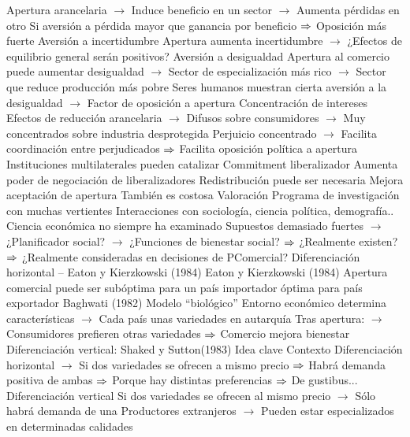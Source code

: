 \documentclass{nuevotema}
\begin{document}
\begin{esquemal}
				\4 Apertura arancelaria
				\4[] $\to$ Induce beneficio en un sector
				\4[] $\to$ Aumenta pérdidas en otro
				\4 Si aversión a pérdida mayor que ganancia por beneficio
				\4[] $\Rightarrow$ Oposición más fuerte
			\3 Aversión a incertidumbre
				\4 Apertura aumenta incertidumbre
				\4[] $\to$ ¿Efectos de equilibrio general serán positivos?
			\3 Aversión a desigualdad
				\4 Apertura al comercio puede aumentar desigualdad
				\4[] $\to$ Sector de especialización más rico
				\4[] $\to$ Sector que reduce producción más pobre
				\4 Seres humanos muestran cierta aversión a la desigualdad
				\4[] $\to$ Factor de oposición a apertura
			\3 Concentración de intereses
				\4 Efectos de reducción arancelaria
				\4[] $\to$ Difusos sobre consumidores
				\4[] $\to$ Muy concentrados sobre industria desprotegida
				\4 Perjuicio concentrado
				\4[] $\to$ Facilita coordinación entre perjudicados
				\4[] $\Rightarrow$ Facilita oposición política a apertura
			\3 Instituciones multilaterales pueden catalizar
				\4 Commitment liberalizador
				\4[] Aumenta poder de negociación de liberalizadores
			\3 Redistribución puede ser necesaria
				\4 Mejora aceptación de apertura
				\4[] También es costosa
			\3 Valoración
				\4 Programa de investigación con muchas vertientes
				\4 Interacciones con sociología, ciencia política, demografía..
				\4 Ciencia económica no siempre ha examinado
				\4[] Supuestos demasiado fuertes
				\4[] $\to$ ¿Planificador social?
				\4[] $\to$ ¿Funciones de bienestar social?
				\4[] $\Rightarrow$ ¿Realmente existen?
				\4[] $\Rightarrow$ ¿Realmente consideradas en decisiones de PComercial?
		\2 Diferenciación horizontal -- Eaton y Kierzkowski (1984)
			\3 Eaton y Kierzkowski (1984)
				\4 Apertura comercial puede ser
				\4[] subóptima para un país importador
				\4[] óptima para país exportador
			\3 Baghwati (1982)
				\4[] Modelo ``biológico''
				\4[] Entorno económico determina características
				\4[] $\to$ Cada país unas variedades en autarquía
				\4[] Tras apertura:
				\4[] $\to$ Consumidores prefieren otras variedades
				\4[] $\Rightarrow$ Comercio mejora bienestar
		\2 Diferenciación vertical: Shaked y Sutton(1983)
			\3 Idea clave
				\4 Contexto
				\4[] Diferenciación horizontal
				\4[] $\to$ Si dos variedades se ofrecen a mismo precio
				\4[] $\Rightarrow$  Habrá demanda positiva de ambas
				\4[] $\Rightarrow$  Porque hay distintas preferencias
				\4[] $\Rightarrow$ De gustibus...
				\4[] Diferenciación vertical
				\4[] Si dos variedades se ofrecen al mismo precio
				\4[] $\to$ Sólo habrá demanda de una
				\4[] Productores extranjeros
				\4[] $\to$ Pueden estar especializados en determinadas calidades

\end{esquemal}
\end{document}
